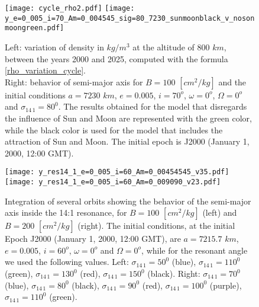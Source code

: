 \documentclass[12pt,reqno]{amsart}
\numberwithin{equation}{section}
\begin{document}
\begin{figure}[h]
\centering {} 
\texttt{[image: cycle\_rho2.pdf]}
\texttt{[image: y\_e=0\_005\_i=70\_Am=0\_004545\_sig=80\_7230\_sunmoonblack\_v\_nosonmoongreen.pdf]}
\caption{Left: variation of density in $kg/m^3$ at the altitude of $800$ $km$, between the years 2000 and 2025, computed with the formula \eqref{rho_variation_cycle}.\\
Right: behavior of semi-major axis  for $B=100$ $[cm^2/kg]$ and the initial conditions $a=7230$ $km$, $e=0.005$, $i=70^o$, $\omega=0^o$, $\Omega=0^o$ and $\sigma_{1\!4\,1}=80^0$. The results obtained for the model that disregards the influence of
Sun and Moon are represented with the  green color, while the black color is used for the model that includes the attraction of
Sun and Moon. The initial epoch  is J2000 (January 1, 2000, 12:00 GMT).  } \label{fig:rho_solar_cycle}
\end{figure}


\begin{figure}[h]
\centering {} 
\texttt{[image: y\_res14\_1\_e=0\_005\_i=60\_Am=0\_00454545\_v35.pdf]}
\texttt{[image: y\_res14\_1\_e=0\_005\_i=60\_Am=0\_009090\_v23.pdf]}
\caption{Integration of several orbits showing the behavior of the semi-major axis inside the 14:1 resonance, for $B=100$ $[cm^2/kg]$ (left) and $B=200$ $[cm^2/kg]$ (right). The initial conditions, at the initial Epoch J2000 (January 1,
2000, 12:00 GMT), are $a=7215.7$ $km$, $e=0.005$, $i=60^o$, $\omega=0^o$ and $\Omega=0^o$, while for the resonant angle we used the following values. Left: $\sigma_{1\!4\,1}=50^0$ (blue), $\sigma_{1\!4\,1}=110^0$ (green), $\sigma_{1\!4\,1}=130^0$ (red), $\sigma_{1\!4\,1}=150^0$ (black). Right: $\sigma_{1\!4\,1}=70^0$ (blue), $\sigma_{1\!4\,1}=80^0$ (black), $\sigma_{1\!4\,1}=90^0$ (red), $\sigma_{1\!4\,1}=100^0$ (purple), $\sigma_{1\!4\,1}=110^0$ (green).} \label{fig:14_1_inside}
\end{figure}
\end{document}
